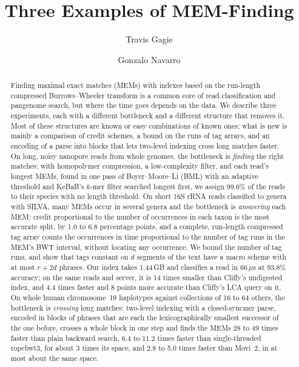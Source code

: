 \documentclass[a4paper,UKenglish,cleveref,autoref,thm-restate]{lipics-v2021}
\title{Three Examples of MEM-Finding}
\author{Travis Gagie}{CeBiB -- Center for Biotechnology and Bioengineering, Chile}{travis.gagie@gmail.com}{https://orcid.org/0000-0003-3689-327X}{}
\author{Gonzalo Navarro}{Department of Computer Science, University of Chile, Santiago, Chile \and CeBiB -- Center for Biotechnology and Bioengineering, Chile}{gnavarro@dcc.uchile.cl}{https://orcid.org/0000-0002-2286-741X}{}
\begin{document}
\maketitle

\begin{abstract}
Finding maximal exact matches (MEMs) with indexes based on the run-length compressed Burrows--Wheeler transform is a common core of read classification and pangenome search, but where the time goes depends on the data.
We describe three experiments, each with a different bottleneck and a different structure that removes it.
Most of these structures are known or easy combinations of known ones; what is new is mainly a comparison of credit schemes, a bound on the runs of tag arrays, and an encoding of a parse into blocks that lets two-level indexing cross long matches faster.
On long, noisy nanopore reads from whole genomes, the bottleneck is \emph{finding} the right matches: with homopolymer compression, a low-complexity filter, and each read's longest MEMs, found in one pass of Boyer--Moore--Li (BML) with an adaptive threshold and KeBaB's $k$-mer filter searched longest first, we assign 99.6\% of the reads to their species with no length threshold.
On short 16S rRNA reads classified to genera with SILVA, many MEMs occur in several genera and the bottleneck is \emph{answering} each MEM: credit proportional to the number of occurrences in each taxon is the most accurate split, by 1.0 to 6.8 percentage points, and a complete, run-length compressed tag array counts the occurrences in time proportional to the number of tag runs in the MEM's BWT interval, without locating any occurrence.
We bound the number of tag runs, and show that tags constant on $d$ segments of the text have a macro scheme with at most $r + 2d$ phrases.
Our index takes 1.44\,GB and classifies a read in 66\,$\mu$s at 93.8\% accuracy; on the same reads and server, it is 14 times smaller than Cliffy's undigested index, and 4.4 times faster and 8 points more accurate than Cliffy's LCA query on it.
On whole human chromosome~19 haplotypes against collections of 16 to 64 others, the bottleneck is \emph{crossing} long matches: two-level indexing with a closed-syncmer parse, encoded in blocks of phrases that are each the lexicographically smallest successor of the one before, crosses a whole block in one step and finds the MEMs 28 to 49 times faster than plain backward search, 6.4 to 11.2 times faster than single-threaded ropebwt3, for about 3 times its space, and 2.8 to 5.0 times faster than Movi~2, in at most about the same space.
\end{abstract}
\clearpage











\appendix




\end{document}
